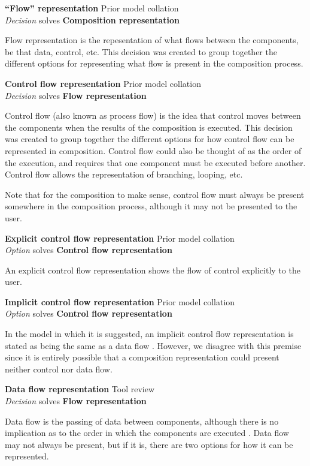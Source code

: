 \textbf{``Flow'' representation} \hfill Prior model collation \\ \emph{Decision} \hfill solves \textbf{Composition representation}

Flow representation is the repesentation of what flows between the components, be that data, control, etc. This decision was created to group together the different options for representing what flow is present in the composition process.

\textbf{Control flow representation} \hfill Prior model collation \\ \emph{Decision} \hfill solves \textbf{Flow representation}

Control flow (also known as process flow) is the idea that control moves between the components when the results of the composition is executed. This decision was created to group together the different options for how control flow can be represented in composition. Control flow could also be thought of as the order of the execution, and requires that one component must be executed before another. Control flow allows the representation of branching, looping, etc.

Note that for the composition to make sense, control flow must always be present somewhere in the composition process, although it may not be presented to the user.

\textbf{Explicit control flow representation} \hfill Prior model collation \cite{Grammel2010,Aghaee2012} \\ \emph{Option} \hfill solves \textbf{Control flow representation}

An explicit control flow representation shows the flow of control explicitly to the user.

\textbf{Implicit control flow representation} \hfill Prior model collation \cite{Aghaee2012} \\ \emph{Option} \hfill solves \textbf{Control flow representation}

In the model in which it is suggested, an implicit control flow representation is stated as being the same as a data flow \cite{Aghaee2012}. However, we disagree with this premise since it is entirely possible that a composition representation could present neither control nor data flow.

\textbf{Data flow representation} \hfill Tool review \\ \emph{Decision} \hfill solves \textbf{Flow representation}

Data flow is the passing of data between components, although there is no implication as to the order in which the components are executed \cite{Wajid2010}. Data flow may not always be present, but if it is, there are two options for how it can be represented.

